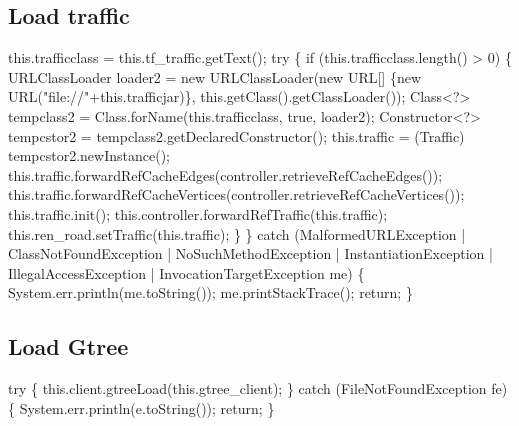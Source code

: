 \subsection{Load traffic}
\nwenddocs{}\endmoddef{}
this.trafficclass = this.tf_traffic.getText();
try \{
  if (this.trafficclass.length() > 0) \{
    URLClassLoader loader2 = new URLClassLoader(new URL[] \{new URL("file://"+this.trafficjar)\},
        this.getClass().getClassLoader());
    Class<?> tempclass2 = Class.forName(this.trafficclass, true, loader2);
    Constructor<?> tempcstor2 = tempclass2.getDeclaredConstructor();
    this.traffic = (Traffic) tempcstor2.newInstance();
    this.traffic.forwardRefCacheEdges(controller.retrieveRefCacheEdges());
    this.traffic.forwardRefCacheVertices(controller.retrieveRefCacheVertices());
    this.traffic.init();
    this.controller.forwardRefTraffic(this.traffic);
    this.ren_road.setTraffic(this.traffic);
  \}
\} catch (MalformedURLException
    | ClassNotFoundException
    | NoSuchMethodException
    | InstantiationException
    | IllegalAccessException
    | InvocationTargetException me) \{
  System.err.println(me.toString());
  me.printStackTrace();
  return;
\}
\nwendcode{}\nwdocspar

\subsection{Load Gtree}
\nwenddocs{}\endmoddef{}
try \{
  this.client.gtreeLoad(this.gtree_client);
\} catch (FileNotFoundException fe) \{
  System.err.println(e.toString());
  return;
\}
\nwendcode{}\nwdocspar

